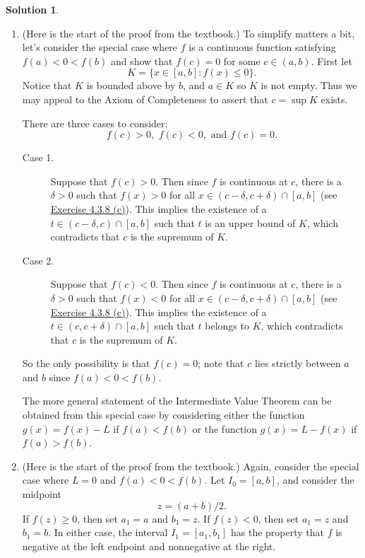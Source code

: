 \documentclass[12pt]{article}
\theoremstyle{definition}
\theoremstyle{exercise}
\theoremstyle{solution}
\newtheorem*{solution}{Solution}
\begin{document}
\begin{solution}
    \begin{enumerate}
        \item (Here is the start of the proof from the textbook.) To simplify matters a bit, let's consider the special case where \( f \) is a continuous function satisfying \( f(a) < 0 < f(b) \) and show that \( f(c) = 0 \) for some \( c \in (a, b) \). First let
        \[
            K = \{ x \in [a, b] : f(x) \leq 0 \}.
        \]
        Notice that \( K \) is bounded above by \( b \), and \( a \in K \) so \( K \) is not empty. Thus we may appeal to the Axiom of Completeness to assert that \( c = \sup K \) exists.

        There are three cases to consider:
        \[
            f(c) > 0, \,\, f(c) < 0, \text{  and  } f(c) = 0.
        \]
        \begin{description}
            \item[Case 1.] Suppose that \( f(c) > 0 \). Then since \( f \) is continuous at \( c \), there is a \( \delta > 0 \) such that \( f(x) > 0 \) for all \( x \in (c - \delta, c + \delta) \cap [a, b] \) (see \href{https://lew98.github.io/Mathematics/UA_Section_4_3_Exercises.pdf}{Exercise 4.3.8 (c)}). This implies the existence of a \( t \in (c - \delta, c) \cap [a, b] \) such that \( t \) is an upper bound of \( K \), which contradicts that \( c \) is the supremum of \( K \).

            \item[Case 2.] Suppose that \( f(c) < 0 \). Then since \( f \) is continuous at \( c \), there is a \( \delta > 0 \) such that \( f(x) < 0 \) for all \( x \in (c - \delta, c + \delta) \cap [a, b] \) (see \href{https://lew98.github.io/Mathematics/UA_Section_4_3_Exercises.pdf}{Exercise 4.3.8 (c)}). This implies the existence of a \( t \in (c, c + \delta) \cap [a, b] \) such that \( t \) belongs to \( K \), which contradicts that \( c \) is the supremum of \( K \).
        \end{description}
        So the only possibility is that \( f(c) = 0 \); note that \( c \) lies strictly between \( a \) and \( b \) since \( f(a) < 0 < f(b) \).

        The more general statement of the Intermediate Value Theorem can be obtained from this special case by considering either the function \( g(x) = f(x) - L \) if \( f(a) < f(b) \) or the function \( g(x) = L - f(x) \) if \( f(a) > f(b) \).

        \item (Here is the start of the proof from the textbook.) Again, consider the special case where \( L = 0 \) and \( f(a) < 0 < f(b) \). Let \( I_0 = [a, b] \), and consider the midpoint
        \[
            z = (a + b)/2.
        \]
        If \( f(z) \geq 0 \), then set \( a_1 = a \) and \( b_1 = z \). If \( f(z) < 0 \), then set \( a_1 = z \) and \( b_1 = b \). In either case, the interval \( I_1 = [a_1, b_1] \) has the property that \( f \) is negative at the left endpoint and nonnegative at the right. 


\end{enumerate}
\end{solution}
\end{document}
